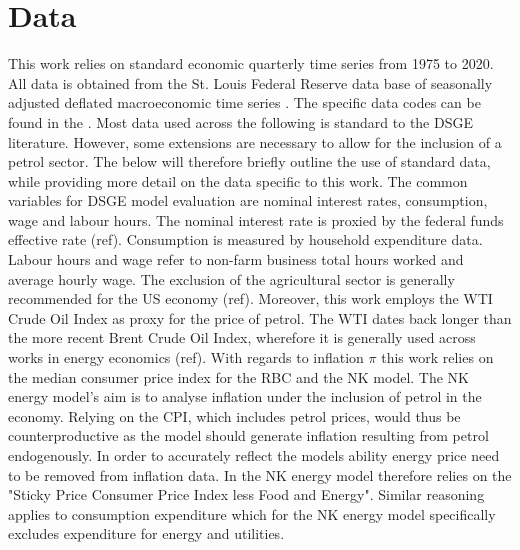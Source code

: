 \documentclass[12pt,a4paper,english]{article} %
\let\oldsection\section
\renewcommand\section{\clearpage\oldsection}
\begin{document}
	

	
	\section{Data}
	This work relies on standard economic quarterly time series from 1975 to 2020. All data is obtained from the St. Louis Federal Reserve data base of seasonally adjusted deflated macroeconomic time series \cite{noauthor_federal_nodate}. The specific data codes can be found in the . Most data used across the following is standard to the DSGE literature. However, some extensions are necessary to allow for the inclusion of a petrol sector. The below will therefore briefly outline the use of standard data, while providing more detail on the data specific to this work.
	The common variables for DSGE model evaluation are nominal interest rates, consumption, wage and labour hours. The nominal interest rate is proxied by the federal funds effective rate (ref). Consumption is measured by household expenditure data. Labour hours and wage refer to non-farm business total hours worked and average hourly wage. The exclusion of the agricultural sector is generally recommended for the US economy (ref). Moreover, this work employs the WTI Crude Oil Index as proxy for the price of petrol. The WTI dates back longer than the more recent Brent Crude Oil Index, wherefore it is generally used across works in energy economics (ref).
	With regards to inflation $\pi$ this work relies on the median consumer price index for the RBC and the NK model. The NK energy model's aim is to analyse inflation under the inclusion of petrol in the economy. Relying on the CPI, which includes petrol prices, would thus be counterproductive as the model should generate inflation resulting from petrol endogenously. In order to accurately reflect the models ability energy price need to be removed from inflation data. In the NK energy model therefore relies on the "Sticky Price Consumer Price Index less Food and Energy". Similar reasoning applies to consumption expenditure which for the NK energy model specifically excludes expenditure for energy and utilities.
	
\end{document}

